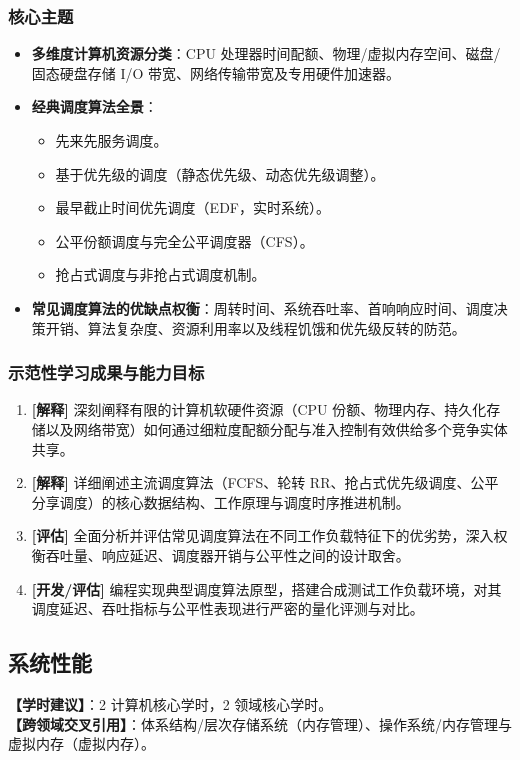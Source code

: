 \subsubsection{核心主题}
\begin{itemize}
    \item \textbf{多维度计算机资源分类}：CPU 处理器时间配额、物理/虚拟内存空间、磁盘/固态硬盘存储 I/O 带宽、网络传输带宽及专用硬件加速器。
    \item \textbf{经典调度算法全景}：
    \begin{itemize}
        \item 先来先服务调度。
        \item 基于优先级的调度（静态优先级、动态优先级调整）。
        \item 最早截止时间优先调度（EDF，实时系统）。
        \item 公平份额调度与完全公平调度器（CFS）。
        \item 抢占式调度与非抢占式调度机制。
    \end{itemize}
    \item \textbf{常见调度算法的优缺点权衡}：周转时间、系统吞吐率、首响响应时间、调度决策开销、算法复杂度、资源利用率以及线程饥饿和优先级反转的防范。
\end{itemize}

\subsubsection{示范性学习成果与能力目标}
\begin{enumerate}
    \item \textbf{[解释]} 深刻阐释有限的计算机软硬件资源（CPU 份额、物理内存、持久化存储以及网络带宽）如何通过细粒度配额分配与准入控制有效供给多个竞争实体共享。
    \item \textbf{[解释]} 详细阐述主流调度算法（FCFS、轮转 RR、抢占式优先级调度、公平分享调度）的核心数据结构、工作原理与调度时序推进机制。
    \item \textbf{[评估]} 全面分析并评估常见调度算法在不同工作负载特征下的优劣势，深入权衡吞吐量、响应延迟、调度器开销与公平性之间的设计取舍。
    \item \textbf{[开发/评估]} 编程实现典型调度算法原型，搭建合成测试工作负载环境，对其调度延迟、吞吐指标与公平性表现进行严密的量化评测与对比。
\end{enumerate}

\subsection{系统性能}
\textbf{【学时建议】}：2 计算机核心学时，2 领域核心学时。\\
\textbf{【跨领域交叉引用】}：体系结构/层次存储系统（内存管理）、操作系统/内存管理与虚拟内存（虚拟内存）。

